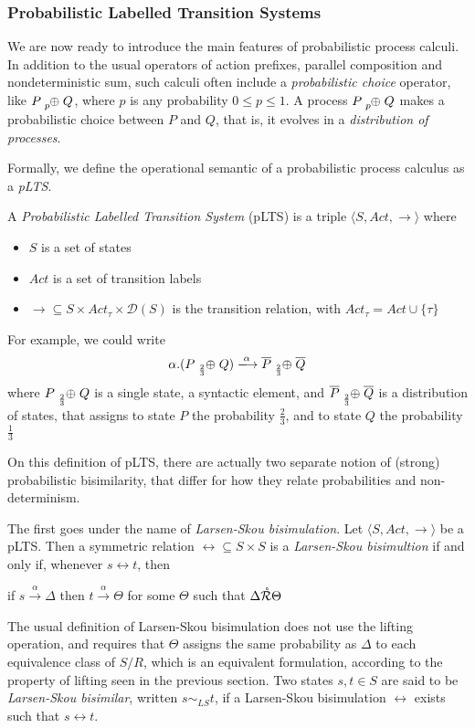 \subsubsection{Probabilistic Labelled Transition Systems}

We are now ready to introduce the main features of probabilistic process calculi. In addition to the usual operators of action prefixes, parallel composition and nondeterministic sum, such calculi often include a \textit{probabilistic choice} operator, like $P \psum{p} Q$, where $p$ is any probability $0 \leq p \leq 1$. A process $P \psum{p} Q$ makes a probabilistic choice between $P$ and $Q$, that is, it evolves in a \textit{distribution of processes}.

Formally, we define the operational semantic of a probabilistic process calculus as a \textit{pLTS}.
	
A \textit{Probabilistic Labelled Transition System} (pLTS) is a triple $\langle S , Act, \rightarrow \rangle$ where \begin{itemize}
\item $S$ is a set of states
\item $Act$ is a set of transition labels
\item $\rightarrow 	\subseteq S\times Act_\tau \times \mathcal{D}(S)$ is the transition relation, with $Act_\tau = Act \cup \{\tau\}$
\end{itemize} 
 For example, we could write 
\[\alpha.(P \psum{\frac{2}{3}} Q) \xlongrightarrow{\alpha} \overline{P} \psum{\frac{2}{3}} \overline{Q}\]
where $P \psum{\frac{2}{3}} Q$ is a single state, a syntactic element, and $\overline{P} \psum{\frac{2}{3}} \overline{Q}$ is a distribution of states, that assigns to state $P$ the probability $\frac{2}{3}$, and to state $Q$ the probability $\frac{1}{3}$


On this definition of pLTS, there are actually two separate notion of (strong) probabilistic bisimilarity, that differ for how they relate probabilities and non-determinism.

The first goes under the name of \textit{Larsen-Skou bisimulation}. Let $\langle S , Act, \rightarrow \rangle$ be a pLTS. Then a symmetric relation $\rel \subseteq S \times S$ is a \textit{Larsen-Skou bisimultion} if and only if, whenever $s \rel t$, then 
\begin{center}
if $s \xrightarrow{\alpha} \Delta$ then $t \xrightarrow{\alpha} \Theta$ for some $\Theta$ such that $\Delta \mathring{\mathcal{R}} \Theta$
\end{center}
The usual definition of Larsen-Skou bisimulation does not use the lifting operation, and requires that $\Theta$ assigns the same probability as $\Delta$ to each equivalence class of $S/R$, which is an equivalent formulation, according to the property of lifting seen in the previous section. Two states $s, t \in S$ are said to be \textit{Larsen-Skou bisimilar}, written $s \sim_{LS} t$, if a Larsen-Skou bisimulation $\rel$ exists such that $s \rel t$.

